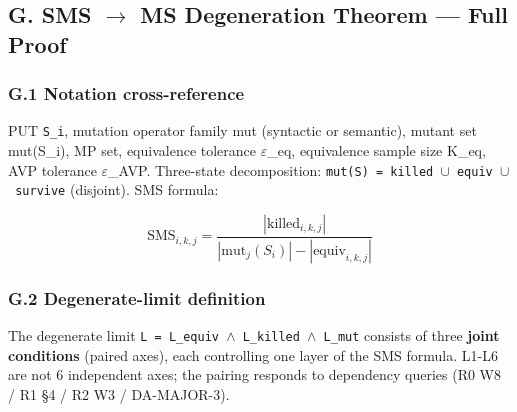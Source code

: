 \documentclass[review,12pt,authoryear]{elsarticle}
\begin{document}

\subsection{G. SMS $\to$ MS Degeneration Theorem --- Full Proof}\label{g.-sms-ms-degeneration-theorem-full-proof}

\subsubsection{G.1 Notation cross-reference}\label{g.1-notation-cross-reference-with-2.1}

PUT \texttt{S\_i}, mutation operator family mut (syntactic or semantic),
mutant set mut(S\_i), MP set, equivalence tolerance $\varepsilon$\_eq, equivalence
sample size K\_eq, AVP tolerance $\varepsilon$\_AVP. Three-state decomposition:
\texttt{mut(S)\ =\ killed\ $\cup$\ equiv\ $\cup$\ survive} (disjoint). SMS
formula:

\[
\mathrm{SMS}_{i,k,j} = \frac{|\mathrm{killed}_{i,k,j}|}{|\mathrm{mut}_j(S_i)| - |\mathrm{equiv}_{i,k,j}|}
\]

\subsubsection{G.2 Degenerate-limit definition}\label{g.2-degenerate-limit-definition-r-8-p1-3-revision-3-joint-conditions}

The degenerate limit \texttt{L\ =\ L\_equiv\ $\wedge$\ L\_killed\ $\wedge$\ L\_mut}
consists of three \textbf{joint conditions} (paired axes), each
controlling one layer of the SMS formula. L1-L6 are not 6 independent
axes; the pairing responds to dependency queries (R0 W8 / R1 §4 / R2 W3
/ DA-MAJOR-3).
\end{document}
